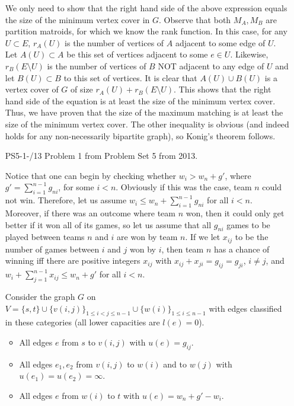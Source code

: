 \documentclass[12pt]{article}
\begin{document}
\begin{enumerate}
We only need to show that the right hand side of the above expression equals the size of the minimum vertex cover in $G$.
Observe that both $M_A, M_B$ are partition matroids, for which we know the rank function.
In this case, for any $U\subset E$, $r_A(U)$ is the number of vertices of $A$ adjacent to some edge of $U$.
Let $A(U) \subset A$ be this set of vertices adjacent to some $e\in U$.
Likewise, $r_B(E\setminus U)$ is the number of vertices of $B$ NOT adjacent to any edge of $U$
and let $B(U) \subset B$ to this set of vertices. It is clear that $A(U) \cup B(U)$
is a vertex cover of $G$ of size $r_A(U) + r_B(E\setminus U)$.
This shows that the right hand side of the equation is at least the size of the minimum vertex cover.
Thus, we have proven that the size of the maximum matching is at least the size of the minimum vertex cover.
The other inequality is obvious (and indeed holds for any non-necessarily bipartite graph), so Konig's theorem follows.

\item[PS5-1-/13] Problem 1 from Problem Set 5 from 2013. 

Notice that one can begin by checking whether $w_i > w_n + g'$, where $g' = \sum_{i=1}^{n-1}{g_{ni}}$, for some $i < n$.
Obviously if this was the case, team $n$ could not win. Therefore, let us assume $w_i \leq w_n + \sum_{i=1}^{n-1}{g_{ni}}$ for all $i<n$.
Moreover, if there was an outcome where team $n$ won, then it could only get better if it won all of its games,
so let us assume that all $g_{ni}$ games to be played between teams $n$ and $i$ are won by team $n$.
If we let $x_{ij}$ to be the number of games between $i$ and $j$ won by $i$, then team $n$
has a chance of winning iff there are positive integers $x_{ij}$ with $x_{ij} + x_{ji} = g_{ij} = g_{ji}$,
$i\neq j$, and $w_i + \sum_{j=1}^{n-1}{x_{ij}} \leq w_n + g'$ for all $i<n$.

Consider the graph $G$ on $V = \{s, t\} \cup \{v(i, j)\}_{1 \leq i < j \leq n-1} \cup \{w(i)\}_{1 \leq i \leq n-1}$
with edges classified in these categories (all lower capacities are $l(e) = 0$).

\begin{itemize}
	\item All edges $e$ from $s$ to $v(i, j)$ with $u(e) = g_{ij}$.
	\item All edges $e_1, e_2$ from $v(i, j)$ to $w(i)$ and to $w(j)$ with $u(e_1) = u(e_2) = \infty$.
	\item All edges $e$ from $w(i)$ to $t$ with $u(e) = w_n + g' - w_i$.
\end{itemize}


\end{enumerate}
\end{document}
